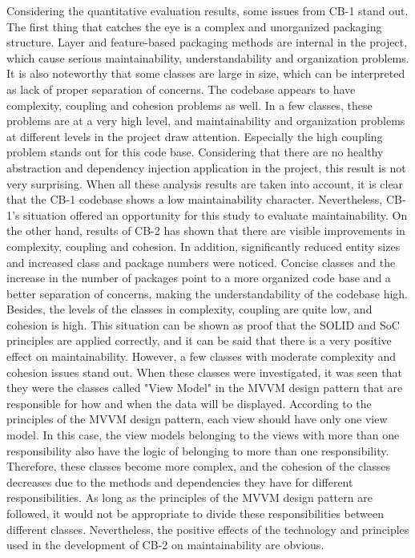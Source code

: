 Considering the quantitative evaluation results, some issues from CB-1 stand out. The first thing that catches the eye is a complex and unorganized packaging structure. Layer and feature-based packaging methods are internal in the project, which cause serious maintainability, understandability and organization problems. It is also noteworthy that some classes are large in size, which can be interpreted as lack of proper separation of concerns. The codebase appears to have complexity, coupling and cohesion problems as well. In a few classes, these problems are at a very high level, and maintainability and organization problems at different levels in the project draw attention. Especially the high coupling problem stands out for this code base. Considering that there are no healthy abstraction and dependency injection application in the project, this result is not very surprising. When all these analysis results are taken into account, it is clear that the CB-1 codebase shows a low maintainability character. Nevertheless, CB-1's situation offered an opportunity for this study to evaluate maintainability. On the other hand, results of CB-2 has shown that there are visible improvements in complexity, coupling and cohesion. In addition, significantly reduced entity sizes and increased class and package numbers were noticed. Concise classes and the increase in the number of packages point to a more organized code base and a better separation of concerns, making the understandability of the codebase high. Besides, the levels of the classes in complexity, coupling are quite low, and cohesion is high. This situation can be shown as proof that the SOLID and SoC principles are applied correctly, and it can be said that there is a very positive effect on maintainability. However, a few classes with moderate complexity and cohesion issues stand out. When these classes were investigated, it was seen that they were the classes called "View Model" in the MVVM design pattern that are responsible for how and when the data will be displayed. According to the principles of the MVVM design pattern, each view should have only one view model. In this case, the view models belonging to the views with more than one responsibility also have the logic of belonging to more than one responsibility. Therefore, these classes become more complex, and the cohesion of the classes decreases due to the methods and dependencies they have for different responsibilities. As long as the principles of the MVVM design pattern are followed, it would not be appropriate to divide these responsibilities between different classes. Nevertheless, the positive effects of the technology and principles used in the development of CB-2 on maintainability are obvious.